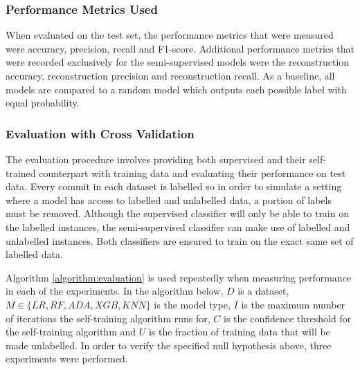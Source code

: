 \documentclass[../main.tex]{subfiles}
\begin{document}
\subsubsection{Performance Metrics Used}

When evaluated on the test set, the performance metrics that were measured were accuracy, precision, recall and F1-score. Additional performance metrics that were recorded exclusively for the semi-supervised models were the reconstruction accuracy, reconstruction precision and reconstruction recall. As a baseline, all models are compared to a random model which outputs each possible label with equal probability. 

\subsubsection{Evaluation with Cross Validation}

The evaluation procedure involves providing both supervised and their self-trained counterpart with training data and evaluating their performance on test data. Every commit in each dataset is labelled so in order to simulate a setting where a model has access to labelled and unlabelled data, a portion of labels must be removed. Although the supervised classifier will only be able to train on the labelled instances, the semi-supervised classifier can make use of labelled and unlabelled instances. Both classifiers are ensured to train on the exact same set of labelled data. 

Algorithm \ref{algorithm:evaluation} is used repeatedly when measuring performance in each of the experiments. In the algorithm below, $D$ is a dataset, $M \in \{LR, RF, ADA, XGB, KNN\}$ is the model type, $I$ is the maximum number of iterations the self-training algorithm runs for, $C$ is the confidence threshold for the self-training algorithm and $U$ is the fraction of training data that will be made unlabelled. In order to verify the specified null hypothesis above, three experiments were performed. 
\end{document}
